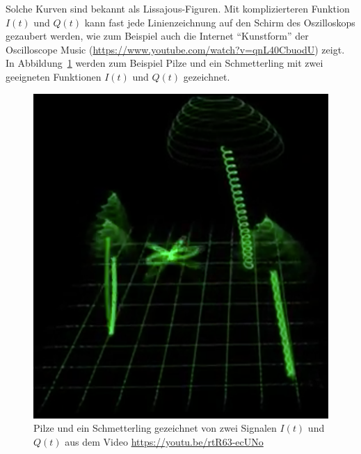 Solche Kurven sind bekannt als Lissajous-Figuren.
Mit komplizierteren Funktion $I(t)$ und $Q(t)$ kann fast jede
Linienzeichnung auf den Schirm des Oszilloskops gezaubert werden,
wie zum Beispiel auch die Internet ``Kunstform'' der Oscilloscope
Music (\url{https://www.youtube.com/watch?v=qnL40CbuodU}) zeigt.
In Abbildung~\ref{figure:qam:pilze} werden zum Beispiel Pilze und
ein Schmetterling mit zwei geeigneten Funktionen $I(t)$ und $Q(t)$
gezeichnet.

\begin{figure}
\centering
\includegraphics[width=0.5\hsize]{applications/qam/images/pilze.png}
\caption{Pilze und ein Schmetterling gezeichnet von zwei Signalen
$I(t)$ und $Q(t)$ aus dem Video \url{https://youtu.be/rtR63-ecUNo}
\label{figure:qam:pilze}}
\end{figure}



